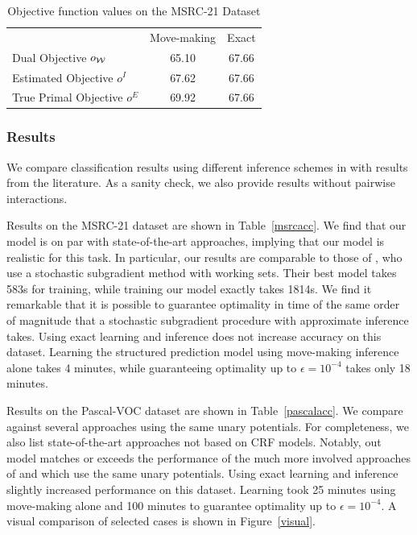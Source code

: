 \begin{table}
    \begin{center}
    \begin{tabularx}{\linewidth}{@{\extracolsep{\fill}}lcc}
    \toprule
                    & Move-making & Exact \\
    \cmidrule{1-3}
    Dual Objective $o_{\mathcal{W}}$ & 65.10 & 67.66  \\
    Estimated Objective $o^I$ &  67.62& 67.66\\
    True Primal Objective $o^E$& 69.92& 67.66\\
    \bottomrule
    \end{tabularx}
    \end{center}
    \caption{Objective function values on the MSRC-21 Dataset}
    \label{msrc_objective}
\end{table}

\subsubsection{Results}
We compare classification results using different inference schemes in
with results from the literature. As a sanity check, we
also provide results without pairwise interactions.

Results on the MSRC-21 dataset are shown in Table~\ref{msrcacc}.
We find that our model is on par with state-of-the-art approaches, implying
that our model is realistic for this task. In particular, our results are comparable to those of
\citet{lucchi2013learning}, who use a stochastic subgradient method with working sets.
Their best model takes 583s for training, while training our model exactly takes 1814s.
We find it remarkable that it is possible to guarantee optimality in time of
the same order of magnitude that a stochastic subgradient procedure with
approximate inference takes. Using exact learning and inference does not increase accuracy
on this dataset.
Learning the structured prediction model using move-making inference alone
takes 4 minutes, while guaranteeing optimality up to  $\epsilon=10^{-4}$
takes only 18 minutes.

Results on the Pascal-VOC dataset are shown in Table~\ref{pascalacc}.
We compare against several approaches using the same unary potentials.
For completeness, we also list state-of-the-art approaches not based on CRF models.
Notably, out model matches or exceeds the performance of the much more involved approaches of
\citet{krahenbuhl2012efficient} and \citet{dann2012pottics} which use the same
unary potentials.
Using exact learning and inference slightly increased performance on this dataset.
Learning took 25 minutes using move-making alone and 100 minutes to guarantee optimality
up to $\epsilon=10^{-4}$.
A visual comparison of selected cases is shown in Figure~\ref{visual}.


